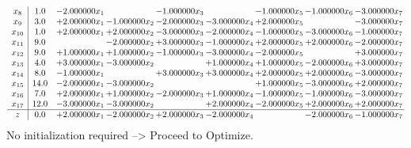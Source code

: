 \documentclass[10pt]{article}
\begin{document}
\[\begin{array}{c| c c@{\hskip 2pt} c@{\hskip 2pt} c@{\hskip 2pt} c@{\hskip 2pt} c@{\hskip 2pt} c@{\hskip 2pt} c@{\hskip 2pt} }
 x_{8}   &  1.0 & -2.000000 x_{1} &   & -1.000000 x_{3} &   & -1.000000 x_{5} & -1.000000 x_{6} & -3.000000 x_{7}\\
 x_{9}   &  3.0 & + 2.000000 x_{1} & -1.000000 x_{2} & -2.000000 x_{3} & -3.000000 x_{4} & + 2.000000 x_{5} &   & -3.000000 x_{7}\\
 x_{10}   &  1.0 & + 2.000000 x_{1} & + 2.000000 x_{2} & -3.000000 x_{3} & -2.000000 x_{4} & -1.000000 x_{5} & -3.000000 x_{6} & -1.000000 x_{7}\\
 x_{11}   &  9.0  &   & -2.000000 x_{2} & + 3.000000 x_{3} & -1.000000 x_{4} & + 2.000000 x_{5} & + 2.000000 x_{6} & -2.000000 x_{7}\\
 x_{12}   &  9.0 & + 1.000000 x_{1} & + 1.000000 x_{2} & -1.000000 x_{3} & -3.000000 x_{4} & -2.000000 x_{5} &   & + 3.000000 x_{7}\\
 x_{13}   &  4.0 & + 3.000000 x_{1} & -3.000000 x_{2} &   & + 1.000000 x_{4} & + 1.000000 x_{5} & -2.000000 x_{6} & + 3.000000 x_{7}\\
 x_{14}   &  8.0 & -1.000000 x_{1} &   & + 3.000000 x_{3} & + 3.000000 x_{4} & + 2.000000 x_{5} & + 2.000000 x_{6} & -3.000000 x_{7}\\
 x_{15}   &  14.0 & -2.000000 x_{1} & -3.000000 x_{2} &    &   & + 1.000000 x_{5} & -3.000000 x_{6} & + 2.000000 x_{7}\\
 x_{16}   &  7.0 & + 2.000000 x_{1} & + 1.000000 x_{2} & -2.000000 x_{3} & + 1.000000 x_{4} & -1.000000 x_{5} & -1.000000 x_{6} & -3.000000 x_{7}\\
 x_{17}   &  12.0 & -3.000000 x_{1} & -3.000000 x_{2} &   & + 2.000000 x_{4} & -2.000000 x_{5} & + 2.000000 x_{6} & + 2.000000 x_{7}\\
\hline
z    &  0.0 & + 2.000000 x_{1} & -2.000000 x_{2} & + 2.000000 x_{3} & -2.000000 x_{4} &   & -2.000000 x_{6} & -1.000000 x_{7}\\
\end{array}\]
No initialization required --> Proceed to Optimize. 
\end{document}
